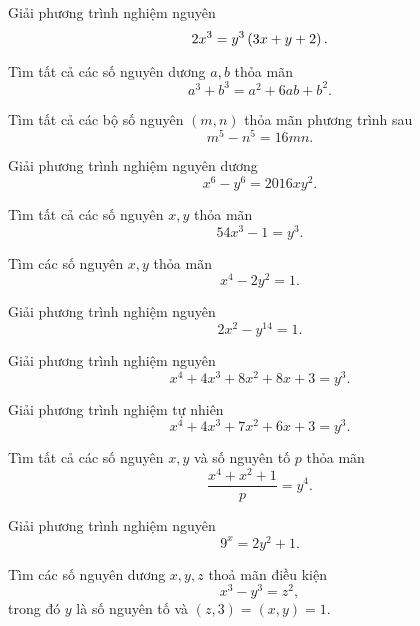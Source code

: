 \begin{btt}
Giải phương trình nghiệm nguyên
\[2x^3=y^3\left(\displaystyle 3x+y+2 \right).\]
\end{btt}

\begin{btt}
Tìm tất cả các số nguyên dương $a,b$ thỏa mãn $$a^3+b^3=a^2+6ab+b^2.$$
\end{btt}

\begin{btt}
Tìm tất cả các bộ số nguyên $(m, n)$ thỏa mãn phương trình sau
\[m^5-n^5=16mn.\]
\end{btt}

\begin{btt}
Giải phương trình nghiệm nguyên dương
    $$x^{6}-y^{6}=2016 x y^{2}.$$
\end{btt}

\begin{btt}
Tìm tất cả các số nguyên $x,y$ thỏa mãn $$54x^3-1=y^3.$$
\end{btt}

\begin{btt}
Tìm các số nguyên $x,y$ thỏa mãn $$x^4- 2y^2 = 1.$$
\end{btt}

\begin{btt}
Giải phương trình nghiệm nguyên
    $$2x^2-y^{14}=1.$$
\end{btt}

\begin{btt}
Giải phương trình nghiệm nguyên \[x^4+4x^3+8x^2+8x+3=y^3.\]
\end{btt}

\begin{btt}
Giải phương trình nghiệm tự nhiên
\[x^4+4x^3+7x^2+6x+3=y^3.\]
\end{btt}

\begin{btt}
Tìm tất cả các số nguyên $x,y$ và số nguyên tố $p$ thỏa mãn \[\dfrac{x^4+x^2+1}{p}=y^4.\]
\end{btt}

\begin{btt}
Giải phương trình nghiệm nguyên $$9^x=2y^2+1.$$
\end{btt}

\begin{btt}
Tìm các số nguyên dương $x,y,z$ thoả mãn điều kiện 
$$x^3-y^3=z^2,$$
trong đó $y$ là số nguyên tố và $(z,3)=(x,y)=1.$
\end{btt}

